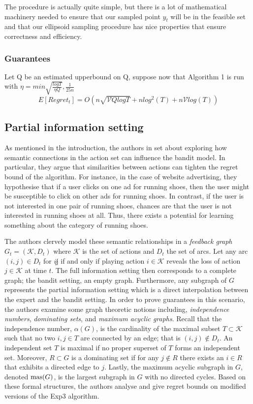 The procedure is actually quite simple, but there is a lot of mathematical machinery needed to
ensure that our sampled point $y_t$ will be in the feasible set and that our ellipsoid sampling
procedure has nice properties that ensure correctness and efficiency. 

\subsubsection{Guarantees}


Let Q be an estimated upperbound on Q, suppose now that Algorithm 1 is run with
$\eta = min{\sqrt{\frac{log T}{\eta Q}}, \frac{1}{25n}}$
\begin{equation}
E[Regret_t] = O(n \sqrt{\mathcal{V}Q log T} + n log^2(T) + n \mathcal{V}log(T))
\end{equation}

\subsection{Partial information setting}
As mentioned in the introduction, the authors in \citep{alon} set about exploring how semantic connections in the action set can influence the bandit model. In particular, they argue that similarities between actions can tighten the regret bound of the algorithm. For instance, in the case of website advertising, they hypothesise that if a user clicks on one ad for running shoes, then the user might be susceptible to click on other ads for running shoes. In contrast, if the user is not interested in one pair of running shoes, chances are that the user is not interested in running shoes at all. Thus, there exists a potential for learning something about the category of running shoes. 

The authors clervely model these semantic relationships in a \textit{feedback graph} $G_t=(\mathcal{K},D_t)$ where $\mathcal{K}$ is the set of actions and $D_t$ the set of arcs. Let any arc $(i,j)\in D_t$ for $i\not j$ if and only if playing action $i\in\mathcal{K}$ reveals the loss of action $j\in \mathcal{K}$ at time $t$. The full information setting then corresponds to a complete graph; the bandit setting, an empty graph. Furthermore, any subgraph of $G$ represents the partial information setting which is a direct interpolation between the expert and the bandit setting. In order to prove guarantees in this scenario, the authors examine some graph theoretic notions including, \textit{independence numbers}, \textit{dominating sets}, and \textit{maximum acyclic graphs}. Recall that the independence number, $\alpha(G)$, is the cardinality of the maximal subset $T\subset \mathcal{K}$ such that no two $i,j\in T$ are connected by an edge; that is $(i,j)\not\in D_t$. An independent set $T$ is maximal if no proper superset of $T$ forms an independent set. Moreover, $R\subset G$ is a dominating set if for any $j\not\in R$ there exists an $i\in R$ that exhibits a directed edge to $j$. Lastly, the maximum acyclic subgraph in $G$, denoted $\text{mas}(G)$, is the largest subgraph in $G$ with no directed cycles. Based on these formal structures, the authors analyse and give regret bounds on modified versions of the Exp3 algorithm. 

